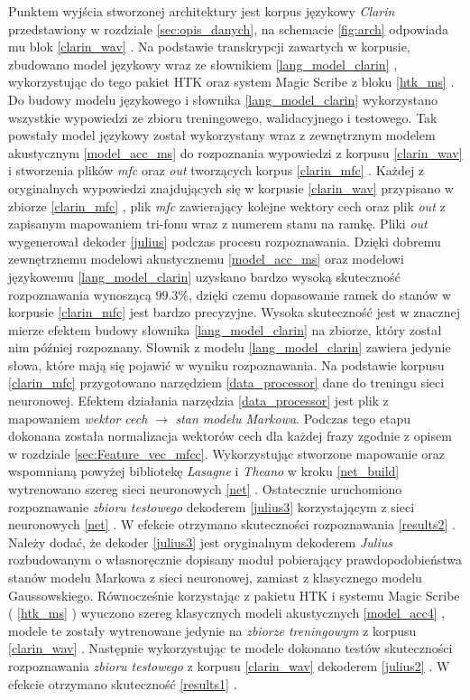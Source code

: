 \documentclass[shortabstract, mgr]{iithesis}
\newcommand{\refBlock}[1]{
	\hyperref[#1]{\ref*{#1}}
}
\begin{document}
	Punktem wyjścia stworzonej architektury jest korpus językowy \textit{Clarin} przedstawiony w rozdziale \ref{sec:opis_danych}, na schemacie \ref{fig:arch} odpowiada mu blok \refBlock{clarin_wav}. Na podstawie transkrypcji zawartych w korpusie, zbudowano model językowy wraz ze słownikiem \refBlock{lang_model_clarin}, wykorzystując do tego pakiet HTK oraz system Magic Scribe z bloku \refBlock{htk_ms}. Do budowy modelu językowego i słownika \refBlock{lang_model_clarin} wykorzystano wszystkie wypowiedzi ze zbioru treningowego, walidacyjnego i testowego. Tak powstały model językowy został wykorzystany wraz z zewnętrznym modelem akustycznym \refBlock{model_acc_ms} do rozpoznania wypowiedzi z korpusu \refBlock{clarin_wav} i stworzenia plików \textit{mfc} oraz \textit{out} tworzących korpus \refBlock{clarin_mfc}. Każdej z oryginalnych wypowiedzi znajdujących się w korpusie \refBlock{clarin_wav} przypisano w zbiorze \refBlock{clarin_mfc}, plik \textit{mfc} zawierający kolejne wektory cech oraz plik \textit{out} z zapisanym mapowaniem tri-fonu wraz z numerem stanu na ramkę. Pliki \textit{out} wygenerował dekoder \refBlock{julius} podczas procesu rozpoznawania. Dzięki dobremu zewnętrznemu  modelowi akustycznemu \refBlock{model_acc_ms} oraz modelowi językowemu \refBlock{lang_model_clarin} uzyskano bardzo wysoką skuteczność rozpoznawania wynoszącą $99.3\%$, dzięki czemu dopasowanie ramek do stanów w korpusie \refBlock{clarin_mfc} jest bardzo precyzyjne. Wysoka skuteczność jest w znacznej mierze efektem budowy słownika \refBlock{lang_model_clarin} na zbiorze, który został nim później rozpoznany. Słownik z modelu \refBlock{lang_model_clarin} zawiera jedynie słowa, które mają się pojawić w wyniku rozpoznawania. Na podstawie korpusu \refBlock{clarin_mfc} przygotowano narzędziem \refBlock{data_processor} dane do treningu sieci neuronowej. Efektem działania narzędzia \refBlock{data_processor} jest plik z mapowaniem \textit{wektor cech} $\longrightarrow$ \textit{stan modelu Markowa}. Podczas tego etapu dokonana została normalizacja wektorów cech dla każdej frazy zgodnie z opisem w rozdziale \ref{sec:Feature_vec_mfcc}. Wykorzystując stworzone mapowanie oraz wspomnianą powyżej bibliotekę \textit{Lasagne} i \textit{Theano} w kroku \refBlock{net_build} wytrenowano szereg sieci neuronowych \refBlock{net}. Ostatecznie uruchomiono rozpoznawanie \textit{zbioru testowego} dekoderem \refBlock{julius3} korzystającym z sieci neuronowych \refBlock{net}. W efekcie otrzymano skuteczności rozpoznawania \refBlock{results2}. Należy dodać, że dekoder \refBlock{julius3} jest oryginalnym dekoderem \textit{Julius} rozbudowanym o własnoręcznie dopisany moduł pobierający prawdopodobieństwa stanów modelu Markowa z sieci neuronowej, zamiast z klasycznego modelu Gaussowskiego. Równocześnie korzystając z pakietu HTK i systemu Magic Scribe (\refBlock{htk_ms}) wyuczono szereg klasycznych modeli akustycznych \refBlock{model_acc4}, modele te zostały wytrenowane jedynie na \textit{zbiorze treningowym} z korpusu \refBlock{clarin_wav}. Następnie wykorzystując te modele dokonano testów skuteczności rozpoznawania \textit{zbioru testowego} z korpusu \refBlock{clarin_wav} dekoderem \refBlock{julius2}. W efekcie otrzymano skuteczność \refBlock{results1}.
	
\end{document}
